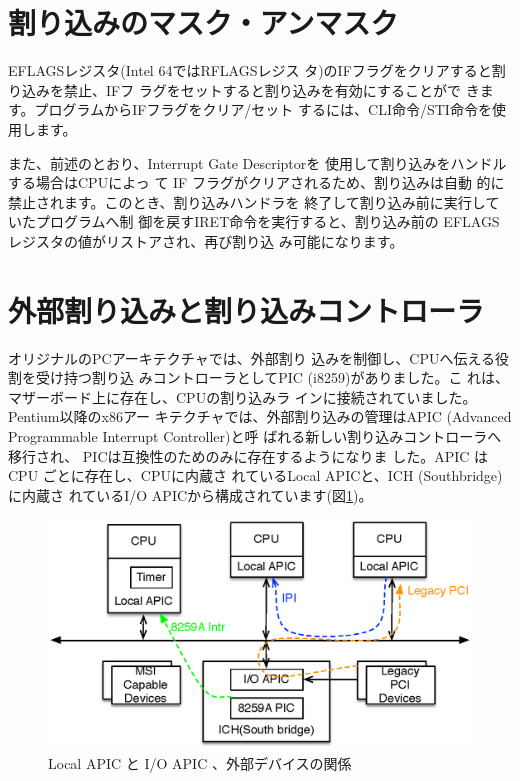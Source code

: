 \section{割り込みのマスク・アンマスク}

 EFLAGSレジスタ(Intel 64ではRFLAGSレジス
タ)のIFフラグをクリアすると割り込みを禁止、IFフ
ラグをセットすると割り込みを有効にすることがで
きます。プログラムからIFフラグをクリア/セット
するには、CLI命令/STI命令を使用します。

 また、前述のとおり、Interrupt Gate Descriptorを
使用して割り込みをハンドルする場合はCPUによっ
て IF フラグがクリアされるため、割り込みは自動
的に禁止されます。このとき、割り込みハンドラを
終了して割り込み前に実行していたプログラムへ制
御を戻すIRET命令を実行すると、割り込み前の
EFLAGSレジスタの値がリストアされ、再び割り込
み可能になります。


\section{外部割り込みと割り込みコントローラ}

 オリジナルのPCアーキテクチャでは、外部割り
込みを制御し、CPUへ伝える役割を受け持つ割り込
みコントローラとしてPIC (i8259)がありました。こ
れは、マザーボード上に存在し、CPUの割り込みラ
インに接続されていました。Pentium以降のx86アー
キテクチャでは、外部割り込みの管理はAPIC
(Advanced Programmable Interrupt Controller)と呼
ばれる新しい割り込みコントローラへ移行され、
PICは互換性のためのみに存在するようになりま
した。APIC は CPU ごとに存在し、CPUに内蔵さ
れているLocal APICと、ICH (Southbridge)に内蔵さ
れているI/O APICから構成されています(図\ref{fig2})。

\begin{figure}\centering
\includegraphics{figures/part4_fig2.eps}
\caption{Local APIC と I/O APIC 、外部デバイスの関係}
\label{fig2}
\end{figure}


